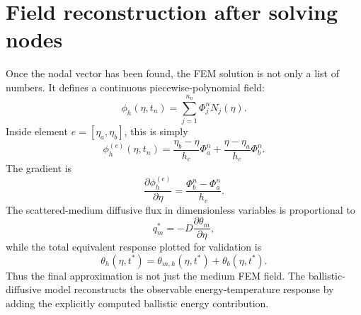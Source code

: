 \documentclass[11pt]{article}
\begin{document}
\section{Field reconstruction after solving nodes}
Once the nodal vector has been found, the FEM solution is not only a list of numbers. It defines a continuous piecewise-polynomial field:
\begin{equation}
    \boxed{
    \phi_h(\eta,t_n)=\sum_{j=1}^{n_n}\Phi_j^nN_j(\eta).}
\end{equation}
Inside element \(e=[\eta_a,\eta_b]\), this is simply
\begin{equation}
    \phi_h^{(e)}(\eta,t_n)=
    \frac{\eta_b-\eta}{h_e}\Phi_a^n+
    \frac{\eta-\eta_a}{h_e}\Phi_b^n.
\end{equation}
The gradient is
\begin{equation}
    \frac{\partial\phi_h^{(e)}}{\partial\eta}
    =\frac{\Phi_b^n-\Phi_a^n}{h_e}.
\end{equation}
The scattered-medium diffusive flux in dimensionless variables is proportional to
\begin{equation}
    q_m^*=-D\frac{\partial\theta_m}{\partial\eta},
\end{equation}
while the total equivalent response plotted for validation is
\begin{equation}
    \boxed{
    \theta_h(\eta,t^*)=\theta_{m,h}(\eta,t^*)+\theta_b(\eta,t^*).}
\end{equation}
Thus the final approximation is not just the medium FEM field. The ballistic-diffusive model reconstructs the observable energy-temperature response by adding the explicitly computed ballistic energy contribution.
\end{document}
